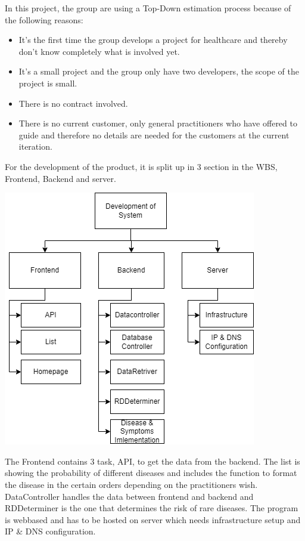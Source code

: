 \pagebreak
In this project, the group are using a Top-Down estimation process because of the following reasons:
\begin{itemize}
	\item It's the first time the group develops a project for healthcare and thereby don't know completely what is involved yet.
	\item It's a small project and the group only have two developers, the scope of the project is small.
	\item There is no contract involved.
	\item There is no current customer, only general practitioners who have offered to guide and therefore no details are needed for the customers at the current iteration.
\end{itemize}
For the development of the product, it is split up in 3 section in the WBS, Frontend, Backend and server. 
\begin{center}
	\includegraphics[width=.5\columnwidth]{./WBS}
\end{center}
The Frontend contains 3 task, API, to get the data from the backend. The list is showing the probability of different diseases and includes the function to format the disease in the certain orders depending on the practitioners wish. DataController handles the data between frontend and backend and RDDeterminer is the one that determines the risk of rare diseases. The program is webbased and has to be hosted on server which needs infrastructure setup and IP \& DNS configuration.

